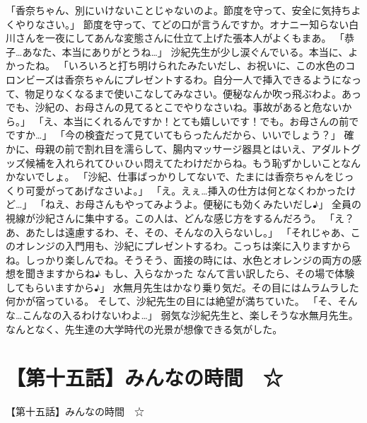 「香奈ちゃん、別にいけないことじゃないのよ。節度を守って、安全に気持ちよくやりなさい。」
節度を守って、てどの口が言うんですか。オナニー知らない白川さんを一夜にしてあんな変態さんに仕立て上げた張本人がよくもまあ。
「恭子…あなた、本当にありがとうね…」
沙紀先生が少し涙ぐんでいる。本当に、よかったね。
「いろいろと打ち明けられたみたいだし、お祝いに、この水色のコロンビーズは香奈ちゃんにプレゼントするわ。自分一人で挿入できるようになって、物足りなくなるまで使いこなしてみなさい。便秘なんか吹っ飛ぶわよ。あっでも、沙紀の、お母さんの見てるとこでやりなさいね。事故があると危ないから。」
「え、本当にくれるんですか！とても嬉しいです！でも。お母さんの前でですか…」
「今の検査だって見ていてもらったんだから、いいでしょう？」
確かに、母親の前で割れ目を濡らして、腸内マッサージ器具とはいえ、アダルトグッズ候補を入れられてひぃひぃ悶えてたわけだからね。もう恥ずかしいことなんかないでしょ。
「沙紀、仕事ばっかりしてないで、たまには香奈ちゃんをじっくり可愛がってあげなさいよ。」
「え。えぇ…挿入の仕方は何となくわかったけど…」
「ねえ、お母さんもやってみようよ。便秘にも効くみたいだし♪」
全員の視線が沙紀さんに集中する。この人は、どんな感じ方をするんだろう。
「え？あ、あたしは遠慮するわ、そ、その、そんなの入らないし。」
「それじゃあ、このオレンジの入門用も、沙紀にプレゼントするわ。こっちは楽に入りますからね。しっかり楽しんでね。そうそう、面接の時には、水色とオレンジの両方の感想を聞きますからね♪ もし、入らなかった なんて言い訳したら、その場で体験してもらいますから♪」
水無月先生はかなり乗り気だ。その目にはムラムラした何かが宿っている。
そして、沙紀先生の目には絶望が満ちていた。
「そ、そんな…こんなの入るわけないわよ…」
弱気な沙紀先生と、楽しそうな水無月先生。なんとなく、先生達の大学時代の光景が想像できる気がした。


\section{【第十五話】みんなの時間　☆}
【第十五話】みんなの時間　☆


